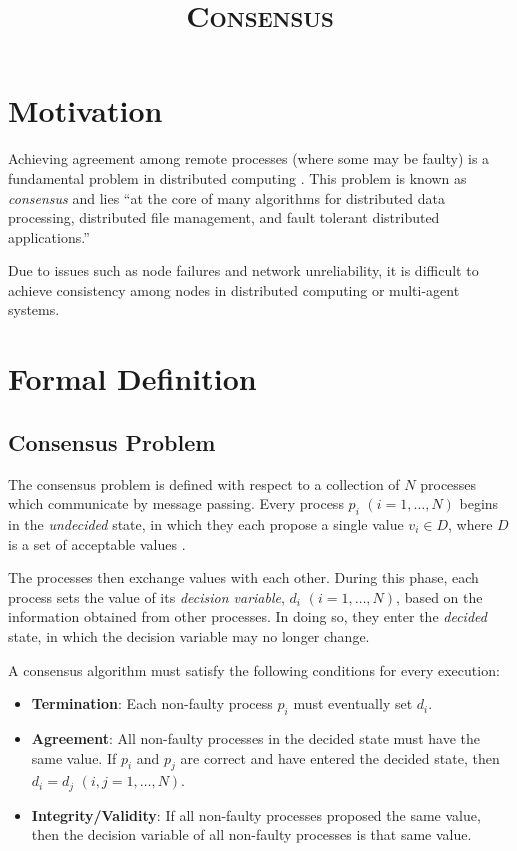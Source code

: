 \documentclass[12pt, a4paper]{article}
\title{\textsc{Consensus}}
\author{}
\date{}
\begin{document}
\maketitle


\section{Motivation}

Achieving agreement among remote processes (where some may be faulty) is a
fundamental problem in distributed computing \cite{fischer1985impossibility}.
This problem is known as \textit{consensus} and lies ``at the core of many
algorithms for distributed data processing, distributed file management, and
fault tolerant distributed applications.'' \cite{fischer1985impossibility}

Due to issues such as node failures and network unreliability, it is difficult
to achieve consistency among nodes in distributed computing or multi-agent
systems.

\section{Formal Definition}

\subsection{Consensus Problem}

The consensus problem is defined with respect to a collection of $N$ processes
which communicate by message passing. Every process $p_{i}$ $(i = 1, \ldots, N)$
begins in the \textit{undecided} state, in which they each propose a single
value $v_{i} \in D$, where $D$ is a set of acceptable values
\cite{coulouris2005distributed}.

The processes then exchange values with each other. During this phase, each
process sets the value of its \textit{decision variable}, $d_i$ $(i = 1, \ldots,
N)$, based on the information obtained from other processes. In doing so, they
enter the \textit{decided} state, in which the decision variable may no longer
change.

A consensus algorithm must satisfy the following conditions for every execution:

\begin{itemize}
  \item \textbf{Termination}: Each non-faulty process $p_i$ must eventually set
    $d_i$.
  \item \textbf{Agreement}: All non-faulty processes in the decided state
    must have the same value. If $p_{i}$ and $p_{j}$ are correct and have
    entered the decided state, then $d_{i} = d_{j}$ $(i, j = 1, \ldots, N)$.
  \item \textbf{Integrity/Validity}: If all non-faulty processes proposed
    the same value, then the decision variable of all non-faulty processes is
    that same value.
\end{itemize}
\end{document}
